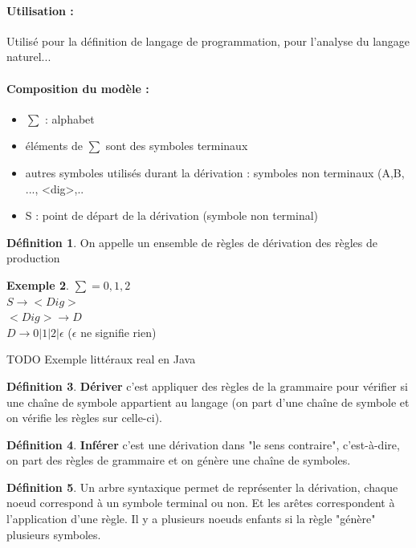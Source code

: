 \documentclass[11pt,a4paper]{article}
\theoremstyle{definition}
\newtheorem{mydef}{Définition}
\newtheorem{myexem}[mydef]{Exemple}
\begin{document}
\paragraph{Utilisation :} Utilisé pour la définition de langage de 
programmation, pour l'analyse du langage naturel...

\paragraph{Composition du modèle :}

\begin{itemize}
	\item $\sum$ : alphabet
	\item éléments de $\sum$ sont des symboles terminaux
	\item autres symboles utilisés durant la dérivation : symboles non 
		terminaux (A,B, ..., <dig>,..
	\item S : point de départ de la dérivation (symbole non terminal)
\end{itemize}

\begin{mydef}
	On appelle un ensemble de règles de dérivation des règles de production
\end{mydef}

\begin{myexem}
	$\sum ={0,1,2}$ \\
	$S \rightarrow <Dig>$ \\
	$<Dig> \rightarrow D$ \\
	$D \rightarrow 0 | 1 |2 | \epsilon $ ($\epsilon$ ne signifie rien)
\end{myexem}
TODO Exemple littéraux real en Java

\begin{mydef}
	\textbf{Dériver} c'est appliquer des règles de la grammaire pour vérifier 
	si une chaîne de symbole appartient au langage (on part d'une chaîne de symbole 
	et on vérifie les règles sur celle-ci).
\end{mydef}

\begin{mydef}
	\textbf{Inférer} c'est une dérivation dans "le sens contraire", 
	c'est-à-dire, on part des règles de grammaire et on génère une chaîne 
	de symboles.
\end{mydef}

\begin{mydef}
	Un arbre syntaxique permet de représenter la dérivation, chaque noeud 
	correspond à un symbole terminal ou non. Et les arêtes correspondent à 
	l'application d'une règle. Il y a plusieurs noeuds enfants si la règle 
	"génère" plusieurs symboles.
\end{mydef}
\end{document}
